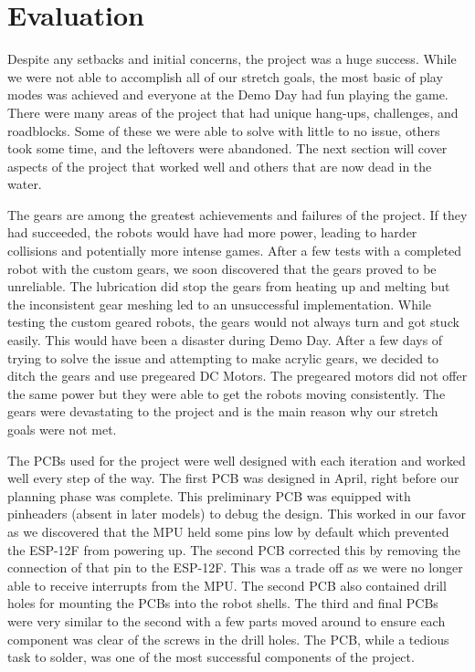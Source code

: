 \documentclass[11pt]{ieeeconf}
\begin{document}
\section{Evaluation}

Despite any setbacks and initial concerns, the project was a huge success. While we were not able to accomplish all of our stretch goals, the most basic of play modes was achieved and everyone at the Demo Day had fun playing the game. There were many areas of the project that had unique hang-ups, challenges, and roadblocks. Some of these we were able to solve with little to no issue, others took some time, and the leftovers were abandoned. The next section will cover aspects of the project that worked well and others that are now dead in the water.

The gears are among the greatest achievements and failures of the project. If they had succeeded, the robots would have had more power, leading to harder collisions and potentially more intense games. After a few tests with a completed robot with the custom gears, we soon discovered that the gears proved to be unreliable. The lubrication did stop the gears from heating up and melting but the inconsistent gear meshing led to an unsuccessful implementation. While testing the custom geared robots, the gears would not always turn and got stuck easily. This would have been a disaster during Demo Day. After a few days of trying to solve the issue and attempting to make acrylic gears, we decided to ditch the gears and use pregeared DC Motors. The pregeared motors did not offer the same power but they were able to get the robots moving consistently. The gears were devastating to the project and is the main reason why our stretch goals were not met.

The PCBs used for the project were well designed with each iteration and worked well every step of the way. The first PCB was designed in April, right before our planning phase was complete. This preliminary PCB was equipped with pinheaders (absent in later models) to debug the design. This worked in our favor as we discovered that the MPU held some pins low by default which prevented the ESP-12F from powering up. The second PCB corrected this by removing the connection of that pin to the ESP-12F. This was a trade off as we were no longer able to receive interrupts from the MPU. The second PCB also contained drill holes for mounting the PCBs into the robot shells. The third and final PCBs were very similar to the second with a few parts moved around to ensure each component was clear of the screws in the drill holes. The PCB, while a tedious task to solder, was one of the most successful components of the project.  
\end{document}
